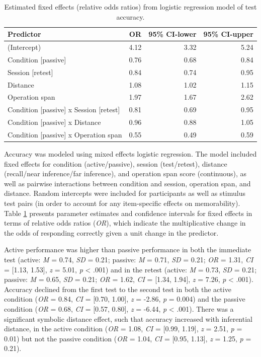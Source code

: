 \documentclass[floatsintext,man]{apa6}
\theoremstyle{definition}
\theoremstyle{definition}
\theoremstyle{definition}
\theoremstyle{remark}
\begin{document}
\begin{table}[tbp]
\begin{center}
\begin{threeparttable}
\caption{\label{tab:accuracy}Estimated fixed effects (relative odds ratios) from logistic regression model of test accuracy.}
\small{
\begin{tabular}{lrrr}
\toprule
Predictor & \multicolumn{1}{c}{OR} & \multicolumn{1}{c}{95\% CI-lower} & \multicolumn{1}{c}{95\% CI-upper}\\
\midrule
(Intercept) & 4.12 & 3.32 & 5.24\\
Condition [passive] & 0.76 & 0.68 & 0.84\\
Session [retest] & 0.84 & 0.74 & 0.95\\
Distance & 1.08 & 1.02 & 1.15\\
Operation span & 1.97 & 1.67 & 2.62\\
Condition [passive] x Session [retest] & 0.81 & 0.69 & 0.95\\
Condition [passive] x Distance & 0.96 & 0.88 & 1.05\\
Condition [passive] x Operation span & 0.55 & 0.49 & 0.59\\
\bottomrule
\end{tabular}
}
\end{threeparttable}
\end{center}
\end{table}

Accuracy was modeled using mixed effects logistic regression. The model
included fixed effects for condition (active/passive), session
(test/retest), distance (recall/near inference/far inference), and
operation span score (continuous), as well as pairwise interactions
between condition and session, operation span, and distance. Random
intercepts were included for participants as well as stimulus test pairs
(in order to account for any item-specific effects on memorability).
Table \ref{tab:accuracy} presents parameter estimates and confidence
intervals for fixed effects in terms of relative odds ratios
(\emph{OR}), which indicate the multiplicative change in the odds of
responding correctly given a unit change in the predictor.

Active performance was higher than passive performance in both the
immediate test (active: \emph{M} = 0.74, \emph{SD} = 0.21; passive:
\emph{M} = 0.71, \emph{SD} = 0.21; \emph{OR} = 1.31, \emph{CI} =
{[}1.13, 1.53{]}, \emph{z} = 5.01, \emph{p} \textless{} .001) and in the
retest (active: \emph{M} = 0.73, \emph{SD} = 0.21; passive: \emph{M} =
0.65, \emph{SD} = 0.21; \emph{OR} = 1.62, \emph{CI} = {[}1.34, 1.94{]},
\emph{z} = 7.26, \emph{p} \textless{} .001). Accuracy declined from the
first test to the second test in both the active condition (\emph{OR} =
0.84, \emph{CI} = {[}0.70, 1.00{]}, \emph{z} = -2.86, \emph{p} = 0.004)
and the passive condition (\emph{OR} = 0.68, \emph{CI} = {[}0.57,
0.80{]}, \emph{z} = -6.44, \emph{p} \textless{} .001). There was a
significant symbolic distance effect, such that accuracy increased with
inferential distance, in the active condition (\emph{OR} = 1.08,
\emph{CI} = {[}0.99, 1.19{]}, \emph{z} = 2.51, \emph{p} = 0.01) but not
the passive condition (\emph{OR} = 1.04, \emph{CI} = {[}0.95, 1.13{]},
\emph{z} = 1.25, \emph{p} = 0.21).
\end{document}
